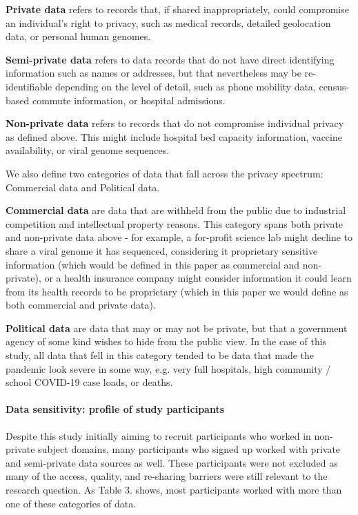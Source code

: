 \documentclass{CUP-JNL-DAP}%
\begin{document}
\textbf{Private data} refers to records that, if shared inappropriately, could compromise an individual's right to privacy, such as medical records, detailed geolocation data, or personal human genomes. 

\textbf{Semi-private data} refers to data records that do not have direct identifying information such as names or addresses, but that nevertheless may be re-identifiable depending on the level of detail, such as phone mobility data, census-based commute information, or hospital admissions.

\textbf{Non-private data} refers to records that do not compromise individual privacy as defined above. This might include hospital bed capacity information, vaccine availability, or viral genome sequences.

We also define two categories of data that fall across the privacy spectrum: Commercial data and Political data.

\textbf{Commercial data} are data that are withheld from the public due to industrial competition and intellectual property reasons. This category spans both private and non-private data above - for example, a for-profit science lab might decline to share a viral genome it has sequenced, considering it proprietary sensitive information (which would be defined in this paper as commercial and non-private), or a health insurance company might consider information it could learn from its health records to be proprietary (which in this paper we would define as both commercial and private data).

\textbf{Political data} are data that may or may not be private, but that a government agency of some kind wishes to hide from the public view. In the case of this study, all data that fell in this category tended to be data that made the pandemic look severe in some way, e.g. very full hospitals, high community / school COVID-19 case loads, or deaths. 

\paragraph{Data sensitivity: profile of study participants}

Despite this study initially aiming to recruit participants who worked in non-private subject domains, many participants who signed up worked with private and semi-private data sources as well. These participants were not excluded as many of the access, quality, and re-sharing barriers were still relevant to the research question. As Table 3. shows, most participants worked with more than one of these categories of data. 
\end{document}
